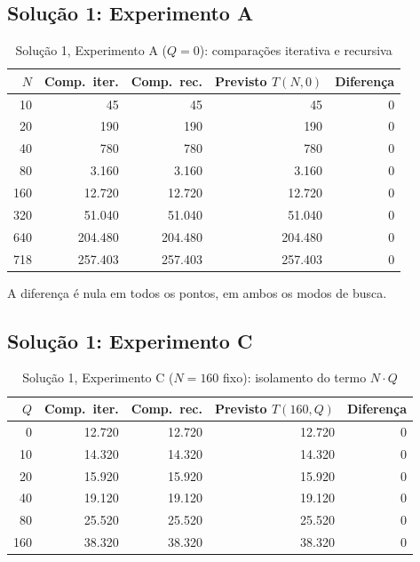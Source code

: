 \documentclass[11pt,a4paper]{article}
\begin{document}
\subsection{Solução 1: Experimento A}

\begin{table}[H]
\centering
\caption{Solução 1, Experimento A ($Q=0$): comparações iterativa e recursiva}
\begin{tabular}{rrrrr}
\toprule
$N$ & Comp.\ iter. & Comp.\ rec. & Previsto $T(N,0)$ & Diferença \\
\midrule
10 & 45 & 45 & 45 & 0 \\
20 & 190 & 190 & 190 & 0 \\
40 & 780 & 780 & 780 & 0 \\
80 & 3.160 & 3.160 & 3.160 & 0 \\
160 & 12.720 & 12.720 & 12.720 & 0 \\
320 & 51.040 & 51.040 & 51.040 & 0 \\
640 & 204.480 & 204.480 & 204.480 & 0 \\
718 & 257.403 & 257.403 & 257.403 & 0 \\
\bottomrule
\end{tabular}
\end{table}

A diferença é nula em todos os pontos, em ambos os modos de busca.

\subsection{Solução 1: Experimento C}

\begin{table}[H]
\centering
\caption{Solução 1, Experimento C ($N=160$ fixo): isolamento do termo $N\cdot Q$}
\begin{tabular}{rrrrr}
\toprule
$Q$ & Comp.\ iter. & Comp.\ rec. & Previsto $T(160,Q)$ & Diferença \\
\midrule
0 & 12.720 & 12.720 & 12.720 & 0 \\
10 & 14.320 & 14.320 & 14.320 & 0 \\
20 & 15.920 & 15.920 & 15.920 & 0 \\
40 & 19.120 & 19.120 & 19.120 & 0 \\
80 & 25.520 & 25.520 & 25.520 & 0 \\
160 & 38.320 & 38.320 & 38.320 & 0 \\
\bottomrule
\end{tabular}
\end{table}
\end{document}
